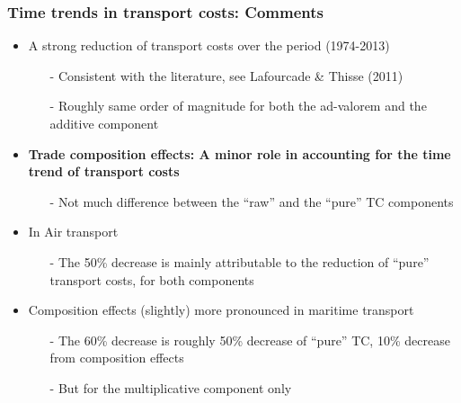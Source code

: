 \documentclass[10 pt,Helvetica, french]{beamer}
\begin{document}
\begin{frame}
\frametitle{Time trends in transport costs: Comments}
\begin{itemize}
\item A strong reduction of transport costs over the period (1974-2013) \vspace{0.1cm}
\begin{itemize}
\footnotesize
\item[-] Consistent with the literature, see Lafourcade \& Thisse (2011) \vspace{0.1cm}
\item[-] Roughly same order of magnitude for both the ad-valorem and the additive component  \vspace{0.1cm}
\normalsize
\end{itemize}
\item \textbf{Trade composition effects: A minor role in accounting for the time trend of transport costs}\vspace{0.1cm}
\begin{itemize}
\footnotesize
\item[-] Not much difference between the ``raw'' and the ``pure'' TC components \vspace{0.1cm}
\normalsize
\end{itemize}
\item In Air transport \vspace{0.1cm}
\begin{itemize}
\footnotesize
\item[-] The 50\% decrease is mainly attributable to the reduction of ``pure'' transport costs, for both components  \vspace{0.1cm}
\end{itemize}
\normalsize
\item Composition effects (slightly) more pronounced in maritime transport \vspace{0.1cm}
\begin{itemize}
\footnotesize
\item[-] The 60\% decrease is roughly 50\% decrease of ``pure'' TC, 10\% decrease from composition effects \vspace{0.1cm}
\item[-] But for the multiplicative component only \vspace{0.1cm}
\end{itemize}
\normalsize
\end{itemize}
\end{frame}
\end{document}

